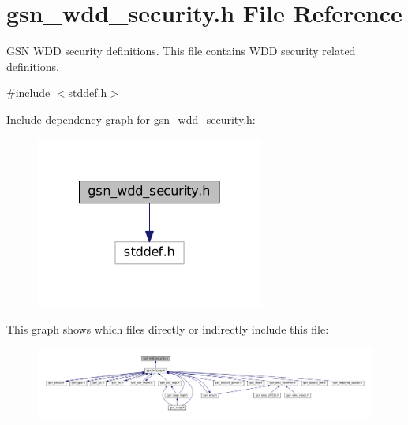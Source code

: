 \hypertarget{a00604}{
\section{gsn\_\-wdd\_\-security.h File Reference}
\label{a00604}
}


GSN WDD security definitions. This file contains WDD security related definitions.  


{\ttfamily \#include $<$stddef.h$>$}\par
Include dependency graph for gsn\_\-wdd\_\-security.h:
\nopagebreak
\begin{figure}[H]
\begin{center}
\leavevmode
\includegraphics[width=212pt]{a00850}
\end{center}
\end{figure}
This graph shows which files directly or indirectly include this file:
\nopagebreak
\begin{figure}[H]
\begin{center}
\leavevmode
\includegraphics[width=400pt]{a00851}
\end{center}
\end{figure}
